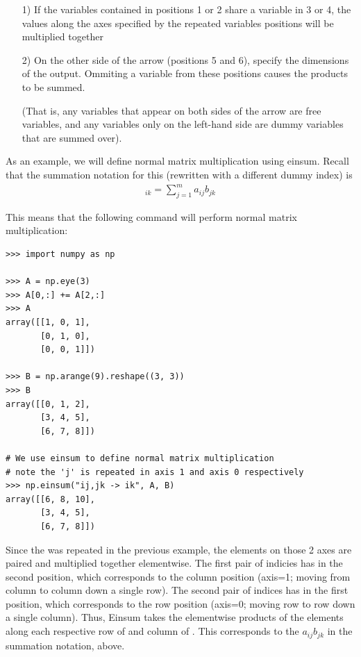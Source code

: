 \begin{enumerate}
\item[1)] If the variables contained in positions 1 or 2 share a variable in 3 or 4, the values along the axes specified by the repeated variables positions will be multiplied together\\
\item[2)] On the other side of the arrow (positions 5 and 6), specify the dimensions of the output.
Ommiting a variable from these positions causes the products to be summed.

(That is, any variables that appear on both sides of the arrow are free variables, and any variables only on the left-hand side are dummy variables that are summed over).
\end{enumerate}
\noindent As an example, we will define normal matrix multiplication using einsum.
Recall that the summation notation for this (rewritten with a different dummy index) is
\begin{align*}
[AB]_{ik} = \sum_{j=1}^{m }a_{ij}b_{jk}
\end{align*}

This means that the following  command will perform normal matrix multiplication:
\begin{lstlisting}
>>> import numpy as np

>>> A = np.eye(3)
>>> A[0,:] += A[2,:]
>>> A
array([[1, 0, 1],
       [0, 1, 0],
       [0, 0, 1]])

>>> B = np.arange(9).reshape((3, 3))
>>> B
array([[0, 1, 2],
       [3, 4, 5],
       [6, 7, 8]])

# We use einsum to define normal matrix multiplication
# note the 'j' is repeated in axis 1 and axis 0 respectively
>>> np.einsum("ij,jk -> ik", A, B)
array([[6, 8, 10],
       [3, 4, 5],
       [6, 7, 8]])

\end{lstlisting}

Since the  was repeated in the previous example, the elements on those 2 axes are paired and multiplied together elementwise.
The first pair of indicies has  in the second position, which corresponds to the column position (axis=1; moving from column to column down a single row).
The second pair of indices has  in the first position, which corresponds to the row position (axis=0; moving row to row down a single column).
Thus, Einsum takes the elementwise products of the elements along each respective row of  and column of . This corresponds to the $a_{ij}b_{jk}$ in the summation notation, above.

